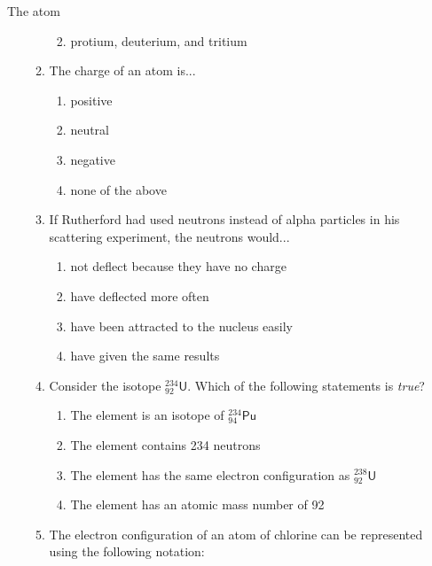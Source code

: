 \begin{eocexercises}{The atom}
\begin{enumerate}[noitemsep, label=\textbf{\arabic*}. ]
\begin{enumerate}[noitemsep, label=\textbf{\alph*}. ]
\begin{enumerate}[noitemsep, label=\textbf{\alph*}. ]
\label{m38741*uid202}\item protium, deuterium, and tritium
\end{enumerate}
                \label{m38741*uid203}\item The charge of an atom is...
\label{m38741*id263355}\begin{enumerate}[noitemsep, label=\textbf{\alph*}. ] 
            \label{m38741*uid204}\item positive
\label{m38741*uid205}\item neutral
\label{m38741*uid206}\item negative
\item none of the above
\end{enumerate}
                \label{m38741*uid207}\item If Rutherford had used neutrons instead of alpha particles in his scattering experiment, the neutrons would...
\label{m38741*id263410}\begin{enumerate}[noitemsep, label=\textbf{\alph*}. ] 
            \label{m38741*uid208}\item not deflect because they have no charge
\label{m38741*uid209}\item have deflected more often
\label{m38741*uid210}\item have been attracted to the nucleus easily
\label{m38741*uid211}\item have given the same results
\end{enumerate}
                \label{m38741*uid212}\item Consider the isotope $_{92}^{234}\mathsf{U}$. Which of the following statements is \textsl{true}?
\label{m38741*id263500}\begin{enumerate}[noitemsep, label=\textbf{\alph*}. ] 
            \label{m38741*uid213}\item The element is an isotope of $_{94}^{234}\mathsf{Pu}$
\label{m38741*uid214}\item The element contains 234 neutrons
\label{m38741*uid215}\item The element has the same electron configuration as $_{92}^{238}\mathsf{U}$
\label{m38741*uid216}\item The element has an atomic mass number of 92
\end{enumerate}
                \label{m38741*uid217}\item The electron configuration of an atom of chlorine can be represented using the following notation:
\label{m38741*id263598}\begin{enumerate}[noitemsep, label=\textbf{\alph*}. ] 

\end{enumerate}
\end{enumerate}
\end{enumerate}
\end{eocexercises}
